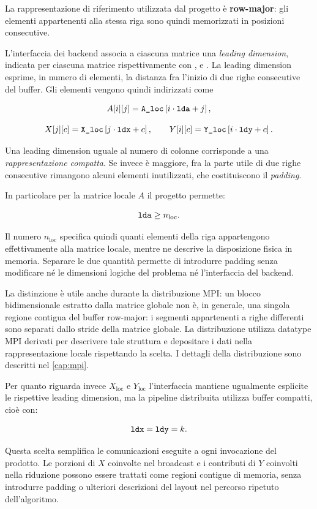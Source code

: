 La rappresentazione di riferimento utilizzata dal progetto è \textbf{row-major}:
gli elementi appartenenti alla stessa riga sono quindi memorizzati in
posizioni consecutive.

L'interfaccia dei backend associa a ciascuna matrice una \emph{leading dimension},
indicata per ciascuna matrice rispettivamente con ,  e . La leading
dimension esprime, in numero di elementi, la distanza fra l'inizio di due
righe consecutive del buffer. Gli elementi vengono quindi indirizzati come

\[
A[i][j]
=
\texttt{A\_loc}
\left[i\cdot\texttt{lda}+j\right],
\]

\[
X[j][c]
=
\texttt{X\_loc}
\left[j\cdot\texttt{ldx}+c\right],
\qquad
Y[i][c]
=
\texttt{Y\_loc}
\left[i\cdot\texttt{ldy}+c\right].
\]

Una leading dimension uguale al numero di colonne corrisponde a una
\emph{rappresentazione compatta}. Se invece è maggiore, fra la parte utile di due
righe consecutive rimangono alcuni elementi inutilizzati, che costituiscono
il \emph{padding}.

In particolare per la matrice locale $A$ il progetto permette:

\[
\texttt{lda}\ge n_{\mathrm{loc}}.
\]

Il numero $n_{\mathrm{loc}}$ specifica quindi quanti elementi della riga
appartengono effettivamente alla matrice locale, mentre  ne
descrive la disposizione fisica in memoria. Separare le due quantità
permette di introdurre padding senza modificare né le dimensioni logiche
del problema né l'interfaccia del backend.

La distinzione è utile anche durante la distribuzione MPI: un blocco
bidimensionale estratto dalla matrice globale non è, in generale, una
singola regione contigua del buffer row-major: i segmenti appartenenti a
righe differenti sono separati dallo stride della matrice globale.
La distribuzione utilizza datatype MPI derivati per descrivere tale
struttura e depositare i dati nella rappresentazione locale rispettando
la  scelta. I dettagli della distribuzione sono descritti nel
\cref{cap:mpi}.

Per quanto riguarda invece $X_{\mathrm{loc}}$ e $Y_{\mathrm{loc}}$ l'interfaccia mantiene
ugualmente esplicite le rispettive leading dimension, ma la pipeline
distribuita utilizza buffer compatti, cioè con:

\[
\texttt{ldx}=\texttt{ldy}=k.
\]

Questa scelta semplifica le comunicazioni eseguite a ogni invocazione del
prodotto. Le porzioni di $X$ coinvolte nel broadcast e i contributi di $Y$
coinvolti nella riduzione possono essere trattati come regioni contigue
di memoria, senza introdurre padding o ulteriori descrizioni del layout
nel percorso ripetuto dell'algoritmo.


